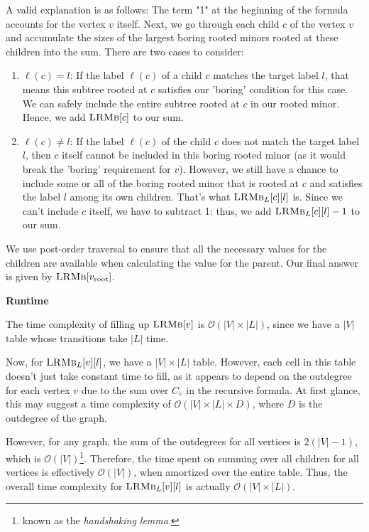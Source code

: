 \documentclass{article}
\begin{document}
        A valid explanation is as follows: The term "1" at the beginning of the formula accounts for the vertex \( v \) itself. Next, we go through each child \( c \) of the vertex \( v \) and accumulate the sizes of the largest boring rooted minors rooted at these children into the sum. There are two cases to consider:
        \begin{enumerate}[label = \arabic*.]
            \item \( \ell(c) = l \): If the label \( \ell(c) \) of a child \( c \) matches the target label \( l \), that means this subtree rooted at \( c \) satisfies our 'boring' condition for this case. We can safely include the entire subtree rooted at \( c \) in our rooted minor. Hence, we add \(\textsc{LRMb}[c]\) to our sum.
            \item \( \ell(c) \neq l \): If the label \( \ell(c) \) of the child \( c \) does not match the target label \( l \), then \( c \) itself cannot be included in this boring rooted minor (as it would break the 'boring' requirement for \( v \)). However, we still have a chance to include some or all of the boring rooted minor that is rooted at \( c \) and satisfies the label \( l \) among its own children. That's what \(\textsc{LRMb}_{L}[c][l]\) is. Since we can't include \( c \) itself, we have to subtract 1: thus, we add \( \textsc{LRMb}_{L}[c][l] - 1 \) to our sum.
        \end{enumerate}
        We use post-order traversal to ensure that all the necessary values for the children are available when calculating the value for the parent. Our final answer is given by $\textsc{LRMb}[v_{\text{root}}]$.

    \vspace{2mm}
    \textbf{Runtime}
    
    The time complexity of filling up $\textsc{LRMb}[v]$ is $\mathcal{O}(|V|\times |L|)$, since we have a $|V|$ table whose transitions take $|L|$ time.

    \vspace{2mm}
    Now, for \( \textsc{LRMb}_{L}[v][l] \), we have a \( |V| \times |L| \) table. However, each cell in this table doesn't just take constant time to fill, as it appears to depend on the outdegree for each vertex \( v \) due to the sum over \( C_v \) in the recursive formula. At first glance, this may suggest a time complexity of \( \mathcal{O}(|V| \times |L| \times D) \), where $D$ is the outdegree of the graph.
    
    \vspace{2mm}
    However, for any graph, the sum of the outdegrees for all vertices is \( 2(|V| - 1) \), which is \( \mathcal{O}(|V|) \)\footnote{known as the \textit{handshaking lemma}.}. Therefore, the time spent on summing over all children for all vertices is effectively \( \mathcal{O}(|V|) \), when amortized over the entire table. 
    Thus, the overall time complexity for \( \textsc{LRMb}_{L}[v][l] \) is actually \( \mathcal{O}(|V| \times |L|) \).
\end{document}
